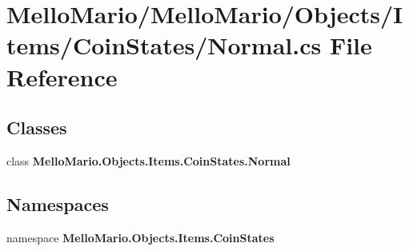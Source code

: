\section{Mello\+Mario/\+Mello\+Mario/\+Objects/\+Items/\+Coin\+States/\+Normal.cs File Reference}
\label{Items_2CoinStates_2Normal_8cs}
\subsection*{Classes}
\begin{DoxyCompactItemize}
\item 
class \textbf{ Mello\+Mario.\+Objects.\+Items.\+Coin\+States.\+Normal}
\end{DoxyCompactItemize}
\subsection*{Namespaces}
\begin{DoxyCompactItemize}
\item 
namespace \textbf{ Mello\+Mario.\+Objects.\+Items.\+Coin\+States}
\end{DoxyCompactItemize}
